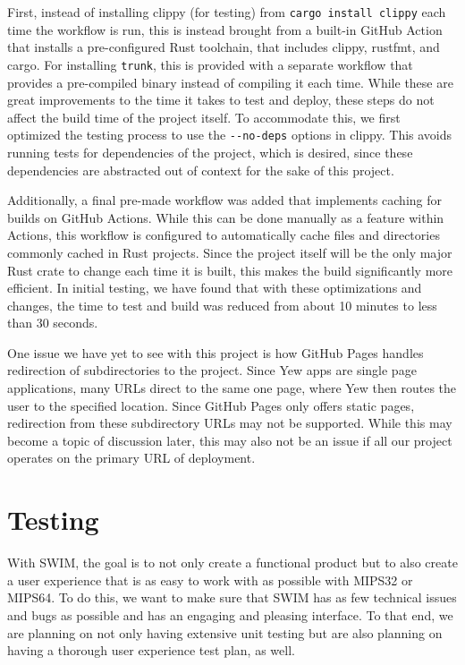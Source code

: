 \documentclass[
    paper=letter,
    parskip=half,
    fontsize=12pt,
    titlepage=firstiscover,
    toc=bibliography,
    numbers=endperiod
]{scrartcl}
\let\oldsection\section
\renewcommand{\section}{\newpage\oldsection}
\begin{document}
First, instead of installing clippy (for testing) from \texttt{cargo
    install clippy} each time the workflow is run, this is instead brought
from a built-in GitHub Action \cite{ga-rust-toolchain} that installs a
pre-configured Rust toolchain, that includes clippy, rustfmt, and cargo.
For installing \texttt{trunk}, this is provided with a separate workflow
\cite{ga-trunk} that provides a pre-compiled binary instead of compiling
it each time. While these are great improvements to the time it takes to
test and deploy, these steps do not affect the build time of the project
itself. To accommodate this, we first optimized the testing process to
use the \texttt{-\/-no-deps} options in clippy. This avoids running
tests for dependencies of the project, which is desired, since these
dependencies are abstracted out of context for the sake of this project.

Additionally, a final pre-made workflow \cite{ga-rust-cache} was added
that implements caching for builds on GitHub Actions. While this can be
done manually as a feature within Actions, this workflow is configured
to automatically cache files and directories commonly cached in Rust
projects. Since the project itself will be the only major Rust crate to
change each time it is built, this makes the build significantly more
efficient. In initial testing, we have found that with these
optimizations and changes, the time to test and build was reduced from
about 10 minutes to less than 30 seconds.

One issue we have yet to see with this project is how GitHub Pages
handles redirection of subdirectories to the project. Since Yew apps are
single page applications, many URLs direct to the same one page, where
Yew then routes the user to the specified location. Since GitHub Pages
only offers static pages, redirection from these subdirectory URLs may
not be supported. While this may become a topic of discussion later,
this may also not be an issue if all our project operates on the primary
URL of deployment.

\section{Testing}

With SWIM, the goal is to not only create a functional product but to
also create a user experience that is as easy to work with as possible
with MIPS32 or MIPS64. To do this, we want to make sure that SWIM has as
few technical issues and bugs as possible and has an engaging and
pleasing interface. To that end, we are planning on not only having
extensive unit testing but are also planning on having a thorough user
experience test plan, as well.
\end{document}
